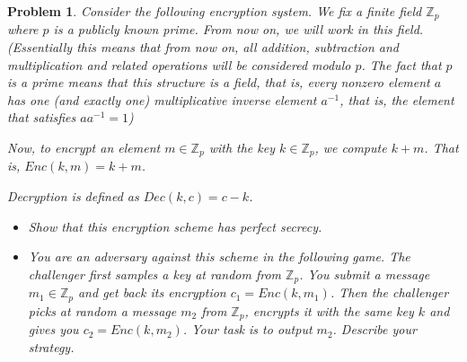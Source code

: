 \documentclass{../homework}
\newtheorem{problem}{Problem}
\begin{document}
\begin{problem}\label{prob2}
    Consider the following encryption system. We fix a finite field
    $\mathbb{Z}_p$ where $p$ is a publicly known prime. From now on, we will
    work in this field. (Essentially this means that from now on, all addition,
    subtraction and multiplication and related operations will be considered
    modulo $p$. The fact that $p$ is a prime means that this structure is a
    field, that is, every nonzero element $a$ has one (and exactly one)
    multiplicative inverse element $a^{-1}$, that is, the element that satisfies
    $aa^{-1}=1$)
    
    Now, to encrypt an element $m\in \mathbb{Z}_p$ with the key $k\in
    \mathbb{Z}_p$, we compute $k+m$. That is, $Enc(k,m)=k+m$.
    
    Decryption is defined as $Dec(k,c)=c-k$.

\begin{itemize}
    \item Show that this encryption scheme has perfect secrecy.
    \item You are an adversary against this scheme in the following game. The
    challenger first samples a key at random from $\mathbb{Z}_p$. You submit a
    message $m_1\in \mathbb{Z}_p$ and get back its encryption $c_1=Enc(k,m_1)$.
    Then the challenger picks at random a message $m_2$  from $\mathbb{Z}_p$,
    encrypts it with the same key $k$ and gives you $c_2=Enc(k,m_2)$. Your task
    is to output $m_2$. Describe your strategy.
\end{itemize}
\end{problem}
\end{document}
